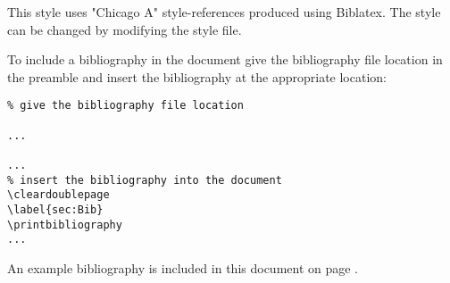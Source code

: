 This style uses "Chicago A" style-references produced using Biblatex. The style can be changed by modifying the style file.

To include a bibliography in the document give the bibliography file location in the preamble and insert the bibliography at the appropriate location:

\begin{lstlisting}
% give the bibliography file location

...

...
% insert the bibliography into the document
\cleardoublepage
\label{sec:Bib}
\printbibliography
...

\end{lstlisting}

An example bibliography is included in this document on page \pageref{sec:TheBibliography}.